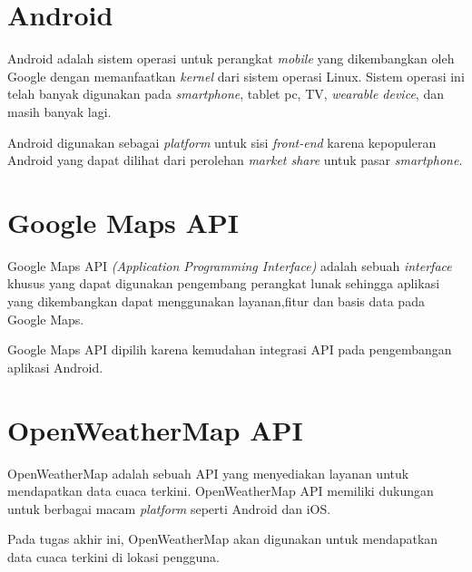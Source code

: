 \section{Android}
Android adalah sistem operasi untuk perangkat \textit{mobile} yang dikembangkan oleh Google dengan memanfaatkan \textit{kernel} dari sistem operasi Linux. Sistem operasi ini telah banyak digunakan pada \textit{smartphone}, tablet pc, TV, \textit{wearable device}, dan masih banyak lagi.

Android digunakan sebagai \textit{platform} untuk sisi \textit{front-end} karena kepopuleran Android yang dapat dilihat dari perolehan \textit{market share} untuk pasar \textit{smartphone}\cite{androidmarket}.

\section{Google Maps API}
Google Maps API \textit{(Application Programming Interface)} adalah sebuah \textit{interface} khusus yang dapat digunakan pengembang perangkat lunak sehingga aplikasi yang dikembangkan dapat menggunakan layanan,fitur dan basis data pada Google Maps.
\par
Google Maps API dipilih karena kemudahan integrasi API pada pengembangan aplikasi Android.  

\section{OpenWeatherMap API}
OpenWeatherMap adalah sebuah API yang menyediakan layanan untuk mendapatkan data cuaca terkini. OpenWeatherMap API memiliki dukungan untuk berbagai macam \textit{platform} seperti Android dan iOS.
\par
Pada tugas akhir ini, OpenWeatherMap akan digunakan untuk mendapatkan data cuaca terkini di lokasi pengguna.


